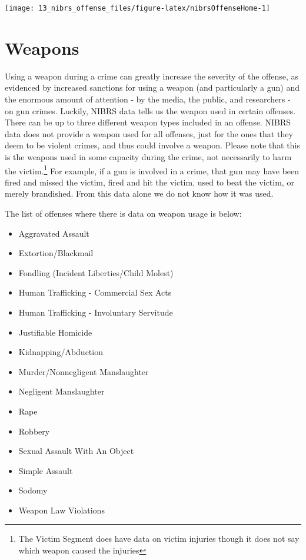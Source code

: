 \documentclass[
]{krantz}
\providecommand{\tightlist}{%
  \setlength{\itemsep}{0pt}\setlength{\parskip}{0pt}}
\let\origfigure\figure
\let\endorigfigure\endfigure
\renewenvironment{figure}[1][2] {
    \expandafter\origfigure\expandafter[H]
} {
    \endorigfigure
}
\begin{document}
\begin{figure}

{\centering \texttt{[image: 13\_nibrs\_offense\_files/figure-latex/nibrsOffenseHome-1]} 

}

\caption{The annual percent of offenses reported as occuring at the victim's home, 1991-2022.}\label{fig:nibrsOffenseHome}
\end{figure}

\section{Weapons}\label{offenseWeapons}

Using a weapon during a crime can greatly increase the
severity of the offense, as evidenced by increased sanctions
for using a weapon (and particularly a gun) and the enormous
amount of attention - by the media, the public, and
researchers - on gun crimes. Luckily, NIBRS data tells us
the weapon used in certain offenses. There can be up to
three different weapon types included in an offense. NIBRS
data does not provide a weapon used for all offenses, just
for the ones that they deem to be violent crimes, and thus
could involve a weapon. Please note that this is the weapons
used in some capacity during the crime, not necessarily to
harm the victim.\footnote{The Victim Segment does have data
  on victim injuries though it does not say which weapon
  caused the injuries} For example, if a gun is involved in
a crime, that gun may have been fired and missed the victim,
fired and hit the victim, used to beat the victim, or merely
brandished. From this data alone we do not know how it was
used.

The list of offenses where there is data on weapon usage is
below:

\begin{itemize}
\tightlist
\item
  Aggravated Assault
\item
  Extortion/Blackmail
\item
  Fondling (Incident Liberties/Child Molest)
\item
  Human Trafficking - Commercial Sex Acts
\item
  Human Trafficking - Involuntary Servitude
\item
  Justifiable Homicide
\item
  Kidnapping/Abduction
\item
  Murder/Nonnegligent Manslaughter
\item
  Negligent Manslaughter
\item
  Rape
\item
  Robbery
\item
  Sexual Assault With An Object
\item
  Simple Assault
\item
  Sodomy
\item
  Weapon Law Violations
\end{itemize}
\end{document}
